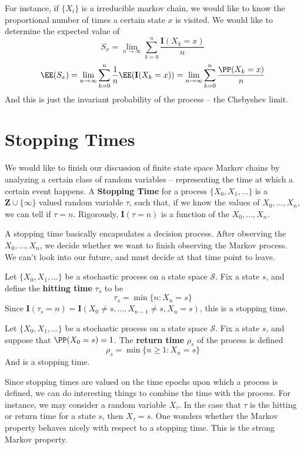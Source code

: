 For instance, if $\{X_i\}$ is a irreducible markov chain, we would like to know the proportional number of times a certain state $x$ is visited. We would like to determine the expected value of
%
\[ S_x = \lim_{n \to \infty} \sum_{k = 0}^n \frac{\mathbf{I}(X_k = x)}{n}  \]
%
\[ \EE(S_x) = \lim_{n \to \infty} \sum_{k = 0}^n \frac{1}{n} \EE(\mathbf{I}(X_k = x)) = \lim_{n \to \infty} \sum_{k = 0}^n \frac{\PP(X_k = x)}{n} \]
%
And this is just the invariant probability of the process -- the Chebyshev limit.

\section{Stopping Times}

We would like to finish our discussion of finite state space Markov chains by analyzing a certain class of random variables -- representing the time at which a certain event happens. A {\bf Stopping Time} for a process $\{ X_0, X_1, \dots \}$ is a $\mathbf{Z} \cup \{ \infty \}$ valued random variable $\tau$, such that, if we know the values of $X_0, \dots, X_n$, we can tell if $\tau = n$. Rigorously, $\mathbf{I}(\tau = n)$ is a function of the $X_0, \dots, X_n$.

A stopping time basically encapsulates a decision process. After observing the $X_0, \dots, X_n$, we decide whether we want to finish observing the Markov process. We can't look into our future, and must decide at that time point to leave.

\begin{example}
    Let $\{ X_0, X_1, \dots \}$ be a stochastic process on a state space $\mathcal{S}$. Fix a state $s$, and define the {\bf hitting time} $\tau_s$ to be
    \[ \tau_s = \min \{ n : X_n = s \} \]
    Since $\mathbf{I}(\tau_s = n) = \mathbf{I}(X_0 \neq s, \dots, X_{n-1} \neq s, X_n = s)$, this is a stopping time.
\end{example}

\begin{example}
    Let $\{ X_0, X_1, \dots \}$ be a stochastic process on a state space $\mathcal{S}$. Fix a state $s$, and suppose that $\PP(X_0 = s) = 1$. The {\bf return time} $\rho_s$ of the process is defined
    \[ \rho_s = \min \{ n \geq 1 : X_n = s \} \]
    And is a stopping time.
\end{example}

Since stopping times are valued on the time epochs upon which a process is defined, we can do interesting things to combine the time with the process. For instance, we may consider a random variable $X_{\tau}$. In the case that $\tau$ is the hitting or return time for a state $s$, then $X_{\tau} = s$. One wonders whether the Markov property behaves nicely with respect to a stopping time. This is the strong Markov property.


